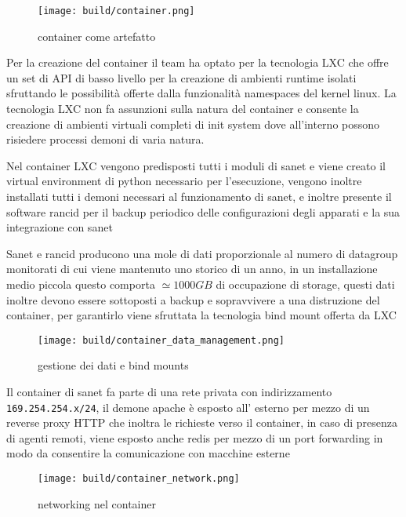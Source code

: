 \begin{figure}[H]
    \centering
    \texttt{[image: build/container.png]}
    \caption{container come artefatto}
    \label{fig:container}
\end{figure}

Per la creazione del container il team ha optato per la tecnologia LXC\cite{lxc} che offre un set di API di basso livello per la creazione di ambienti runtime isolati sfruttando le possibilità offerte dalla funzionalità namespaces del kernel linux. La tecnologia LXC non fa assunzioni sulla natura del container e consente la creazione di ambienti virtuali completi di init system dove all'interno possono risiedere processi demoni di varia natura.

Nel container LXC vengono predisposti tutti i moduli di sanet e viene creato il virtual environment di python necessario per l'esecuzione, vengono inoltre installati tutti i demoni necessari al funzionamento di sanet, e inoltre presente il software rancid per il backup periodico delle configurazioni degli apparati e la sua integrazione con sanet

Sanet e rancid producono una mole di dati proporzionale al numero di datagroup monitorati di cui viene mantenuto uno storico di un anno, in un installazione medio piccola questo comporta \(\simeq 1000 GB\) di occupazione di storage, questi dati inoltre devono essere sottoposti a backup e sopravvivere a una distruzione del container, per garantirlo viene sfruttata la tecnologia bind mount offerta da LXC\cite{lxc}

\begin{figure}[H]
    \centering
    \texttt{[image: build/container\_data\_management.png]}
    \caption{gestione dei dati e bind mounts}
    \label{fig:container_data_management}
\end{figure}

Il container di sanet fa parte di una rete privata con indirizzamento \verb|169.254.254.x/24|, il demone apache è esposto all' esterno per mezzo di un reverse proxy HTTP che inoltra le richieste verso il container, in caso di presenza di agenti remoti, viene esposto anche redis per mezzo di un port forwarding in modo da consentire la comunicazione con macchine esterne

\begin{figure}[H]
    \centering
    \texttt{[image: build/container\_network.png]}
    \caption{networking nel container}
    \label{fig:container_network}
\end{figure}

